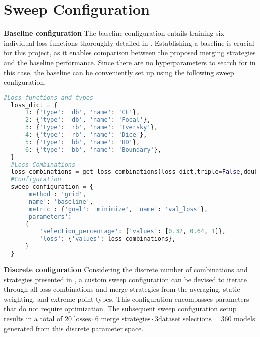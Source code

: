 \section{Sweep Configuration}
\label{sec:sweep_configuration}
\textbf{Baseline configuration}\newline
The baseline configuration entails training six individual loss functions thoroughly detailed in . Establishing a baseline is crucial for this project, as it enables comparison between the proposed merging strategies and the baseline performance. Since there are no hyperparameters to search for in this case, the baseline can be conveniently set up using the following sweep configuration.
\begin{lstlisting}[style=mystyle,language=Python, numbers=none, caption={The baseline configuration comprises training six loss functions for each data selection percentage, leading to a total of 18 models to be trained.}]
  #Loss functions and types
  loss_dict = {
      1: {'type': 'db', 'name': 'CE'},
      2: {'type': 'db', 'name': 'Focal'},
      3: {'type': 'rb', 'name': 'Tversky'},
      4: {'type': 'rb', 'name': 'Dice'},
      5: {'type': 'bb', 'name': 'HD'},
      6: {'type': 'bb', 'name': 'Boundary'},
  }
  #Loss Combinations
  loss_combinations = get_loss_combinations(loss_dict,triple=False,double=False,baseline=True)
  #Configuration
  sweep_configuration = {
      'method': 'grid',
      'name': 'baseline',
      'metric': {'goal': 'minimize', 'name': 'val_loss'},
      'parameters':
      {   
          'selection_percentage': {'values': [0.32, 0.64, 1]},
          'loss': {'values': loss_combinations},
      }
  }
\end{lstlisting}

\textbf{Discrete configuration}\newline
Considering the discrete number of combinations and strategies presented in , a custom sweep configuration can be devised to iterate through all loss combinations and merge strategies from the averaging, static weighting, and extreme point types. This configuration encompasses parameters that do not require optimization. The subsequent sweep configuration setup results in a total of $20 \text{ losses} \cdot 6\text{ merge strategies} \cdot 3\text{dataset selections} = 360$ models generated from this discrete parameter space.

